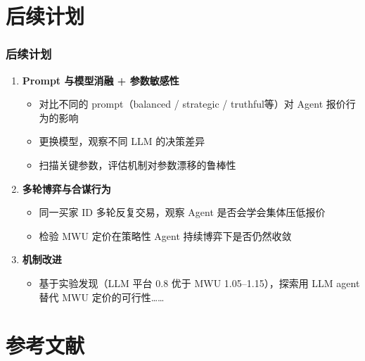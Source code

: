 \documentclass[10pt,aspectratio=169]{beamer}
\begin{document}
\section{后续计划}

\begin{frame}
	\frametitle{后续计划}

	\begin{enumerate}
		\item \textbf{Prompt 与模型消融 + 参数敏感性}
		      \begin{itemize}
			      \item 对比不同的 prompt（balanced / strategic / truthful等）对 Agent 报价行为的影响
			      \item 更换模型，观察不同 LLM 的决策差异
			      \item 扫描关键参数，评估机制对参数漂移的鲁棒性
		      \end{itemize}

		\vspace{0.3cm}
		\item \textbf{多轮博弈与合谋行为}
		      \begin{itemize}
			      \item 同一买家 ID 多轮反复交易，观察 Agent 是否会学会集体压低报价
			      \item 检验 MWU 定价在策略性 Agent 持续博弈下是否仍然收敛
		      \end{itemize}

		\vspace{0.3cm}
		\item \textbf{机制改进}
		      \begin{itemize}
			      \item 基于实验发现（LLM 平台 0.8 优于 MWU 1.05--1.15），探索用 LLM agent替代 MWU 定价的可行性……
		      \end{itemize}
	\end{enumerate}
\end{frame}

\section{参考文献}
\end{document}

